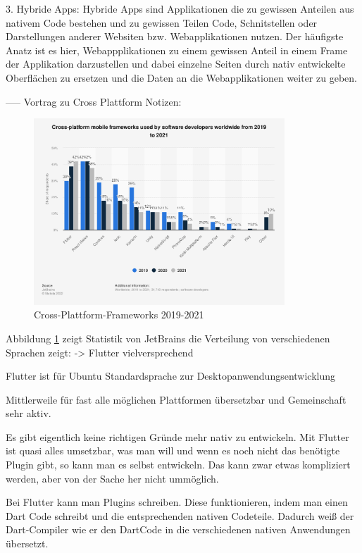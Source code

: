 3. Hybride Apps:
Hybride Apps sind Applikationen die zu gewissen Anteilen aus nativem Code bestehen und zu gewissen Teilen Code, Schnitstellen oder Darstellungen anderer Websiten bzw. Webapplikationen nutzen. Der häufigste Anatz ist es hier, Webappplikationen zu einem gewissen Anteil in einem Frame der Applikation darzustellen und dabei einzelne Seiten durch nativ entwickelte Oberflächen zu ersetzen und die Daten an die Webapplikationen weiter zu geben. 



-----
Vortrag zu Cross Plattform Notizen:

\begin{figure}[ht]
  \centering
  \includegraphics[height=7cm,keepaspectratio]{images/cross-platform-mobile-frameworks.png} 
  \caption{Cross-Plattform-Frameworks 2019-2021}
  \label{fig:statista_cross_plattform}
\end{figure}

Abbildung \ref{fig:statista_cross_plattform} zeigt Statistik von JetBrains die Verteilung von verschiedenen Sprachen zeigt:
 -> Flutter vielversprechend
 
Flutter ist für Ubuntu Standardsprache zur Desktopanwendungsentwicklung

Mittlerweile für fast alle möglichen Plattformen übersetzbar und Gemeinschaft sehr aktiv.

Es gibt eigentlich keine richtigen Gründe mehr nativ zu entwickeln. Mit Flutter ist quasi alles umsetzbar, was man will und wenn es noch nicht das benötigte Plugin gibt, so kann man es selbst entwickeln. Das kann zwar etwas kompliziert werden, aber von der Sache her nicht ummöglich.

Bei Flutter kann man Plugins schreiben. Diese funktionieren, indem man einen Dart Code schreibt und die entsprechenden nativen Codeteile. Dadurch weiß der Dart-Compiler wie er den DartCode in die verschiedenen nativen Anwendungen übersetzt.

